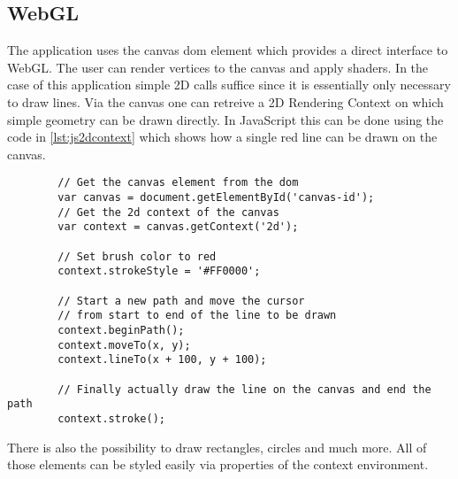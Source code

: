 \subsection{WebGL}

%     

The application uses the canvas dom element which provides a direct interface to WebGL. The user can render vertices to the canvas and apply shaders.
In the case of this application simple 2D calls suffice since it is essentially only necessary to draw lines.
Via the canvas one can retreive a 2D Rendering Context on which simple geometry can be drawn directly.
In JavaScript this can be done using the code in \ref{lst:js2dcontext} which shows how a single red line can be drawn on the canvas.

\begin{tcolorbox}[
        title={
            \refstepcounter{listing}
            Listing \thelisting: JavaScript ``Get 2D Rendering Context''
            \label{lst:js2dcontext}
            \addcontentsline{lol}{listing}{\protect\numberline{\thelisting}}
        }
    ]
    \begin{verbatim}
        // Get the canvas element from the dom
        var canvas = document.getElementById('canvas-id');
        // Get the 2d context of the canvas
        var context = canvas.getContext('2d');

        // Set brush color to red
        context.strokeStyle = '#FF0000';

        // Start a new path and move the cursor
        // from start to end of the line to be drawn
        context.beginPath();
        context.moveTo(x, y);
        context.lineTo(x + 100, y + 100);

        // Finally actually draw the line on the canvas and end the path
        context.stroke();
    \end{verbatim}
\end{tcolorbox}

There is also the possibility to draw rectangles, circles and much more. All of those elements can be styled easily via properties of the context environment.

